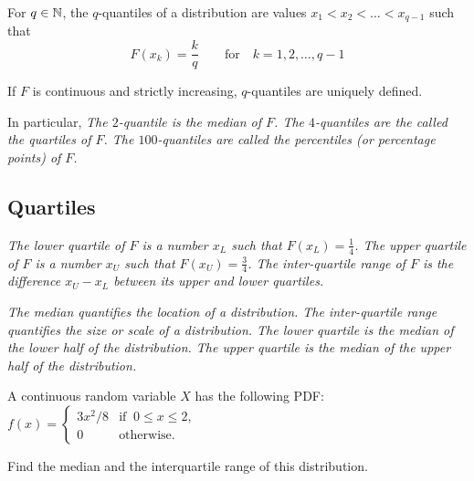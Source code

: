 \begin{definition}
For $q\in\mathbb{N}$, the $q$-quantiles of a distribution are values $x_1 < x_2 < \ldots < x_{q-1}$ such that 
\[
F(x_k) = \frac{k}{q} \qquad\text{for}\quad k=1,2,\ldots,q-1
\]
\end{definition}

\begin{remark}
If $F$ is continuous and strictly increasing, $q$-quantiles are uniquely defined.
\end{remark}

In particular,
\bit
\it The $2$-quantile is the \emph{median} of $F$.
\it The $4$-quantiles are the called the \emph{quartiles} of $F$.
\it The $100$-quantiles are called the \emph{percentiles} (or \emph{percentage points}) of $F$.
\eit

\subsection{Quartiles}
\begin{definition}
\ben
\it 
The \emph{lower quartile} of $F$ is a number $x_L$ such that $\displaystyle F(x_L) = \frac{1}{4}$.
\it
The \emph{upper quartile} of $F$ is a number $x_U$ such that $\displaystyle F(x_U) = \frac{3}{4}$.
\it 
The \emph{inter-quartile range} of $F$ is the difference $x_U-x_L$ between its upper and lower quartiles.
\een
\end{definition}

\begin{remark}
\bit
\it The median quantifies the \emph{location} of a distribution.
\it The inter-quartile range quantifies the \emph{size} or \emph{scale} of a distribution.
\it The lower quartile is the median of the lower half of the distribution.
\it The upper quartile is the median of the upper half of the distribution.
\eit
\end{remark}


\begin{example}
A continuous random variable $X$ has the following PDF:
$
f(x) = \begin{cases}
	3x^2/8		& \text{if }\ 0\leq x\leq 2, \\
	0		& \text{otherwise}.	
\end{cases}
$
\par
Find the median and the interquartile range of this distribution.
\end{example}

